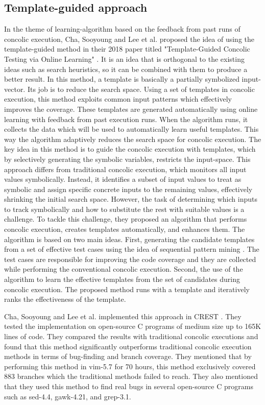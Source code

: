 \documentclass[ runningheads,
               a4paper]{llncs}
\begin{document}


\subsection{Template-guided approach}
In the theme of learning-algorithm based on the feedback from past runs of concolic execution, Cha, Sooyoung and Lee et al. proposed the idea of using the template-guided method in their 2018 paper titled "Template-Guided Concolic Testing via Online Learning" \cite{cha2018template}. It is an idea that is orthogonal to the existing ideas such as search heuristics, so it can be combined with them to produce a better result. In this method, a template is basically a partially symbolized input-vector. Its job is to reduce the search space.
Using a set of templates in concolic execution, this method exploits common input patterns which effectively improves the coverage.
These templates are generated automatically using online learning with feedback from past execution runs. When the algorithm runs, it collects the data which will be used to automatically learn useful templates. This way the algorithm adaptively reduces the search space for concolic execution. The key idea in this method is to guide the concolic execution with templates, which by selectively generating the symbolic variables, restricts the input-space. This approach differs from traditional concolic execution, which monitors all input values symbolically. Instead, it identifies a subset of input values to treat as symbolic and assign specific concrete inputs to the remaining values, effectively shrinking the initial search space. However, the task of determining which inputs to track symbolically and how to substitute the rest with suitable values is a challenge. To tackle this challenge, they proposed an algorithm that performs concolic execution, creates templates automatically, and enhances them. The algorithm is based on two main ideas. First, generating the candidate templates from a set of effective test cases using the idea of sequential pattern mining \cite{fumarola2016clofast}. The test cases are responsible for improving the code coverage and they are collected while performing the conventional concolic execution. Second, the use of the algorithm to learn the effective templates from the set of candidates during concolic execution. The proposed method runs with a template and iteratively ranks the effectiveness of the template.


Cha, Sooyoung and Lee et al. implemented this approach \cite{cha2018template} in CREST \cite{kousik2008heuristic}. They tested the implementation on open-source C programs of medium size up to 165K lines of code. They compared the results with traditional concolic executions and found that this method significantly outperforms traditional concolic execution methods in terms of bug-finding and branch coverage. They mentioned that by performing this method in vim-5.7 for 70 hours, this method exclusively covered 883 branches which the traditional methods failed to reach. They also mentioned that they used this method to find real bugs in several open-source C programs such as sed-4.4, gawk-4.21, and grep-3.1.
\end{document}
